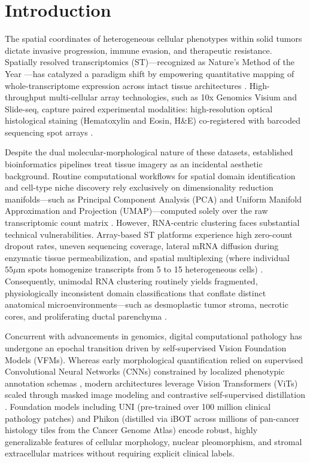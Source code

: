 \documentclass[11pt, a4paper]{article}
\begin{document}
\section{Introduction}

The spatial coordinates of heterogeneous cellular phenotypes within solid tumors dictate invasive progression, immune evasion, and therapeutic resistance. Spatially resolved transcriptomics (ST)—recognized as Nature's Method of the Year \cite{marx2021method}—has catalyzed a paradigm shift by empowering quantitative mapping of whole-transcriptome expression across intact tissue architectures \cite{stahl2016visualization, rao2021exploring, moses2022museum}. High-throughput multi-cellular array technologies, such as 10x Genomics Visium and Slide-seq, capture paired experimental modalities: high-resolution optical histological staining (Hematoxylin and Eosin, H\&E) co-registered with barcoded sequencing spot arrays \cite{stahl2016visualization, palla2022squidpy}.

Despite the dual molecular-morphological nature of these datasets, established bioinformatics pipelines treat tissue imagery as an incidental aesthetic background. Routine computational workflows for spatial domain identification and cell-type niche discovery rely exclusively on dimensionality reduction manifolds—such as Principal Component Analysis (PCA) and Uniform Manifold Approximation and Projection (UMAP)—computed solely over the raw transcriptomic count matrix \cite{wolf2018scanpy, hao2021integrated}. However, RNA-centric clustering faces substantial technical vulnerabilities. Array-based ST platforms experience high zero-count dropout rates, uneven sequencing coverage, lateral mRNA diffusion during enzymatic tissue permeabilization, and spatial multiplexing (where individual $55\mu\text{m}$ spots homogenize transcripts from 5 to 15 heterogeneous cells) \cite{larsson2021spatially}. Consequently, unimodal RNA clustering routinely yields fragmented, physiologically inconsistent domain classifications that conflate distinct anatomical microenvironments—such as desmoplastic tumor stroma, necrotic cores, and proliferating ductal parenchyma \cite{andersson2020single}.

Concurrent with advancements in genomics, digital computational pathology has undergone an epochal transition driven by self-supervised Vision Foundation Models (VFMs). Whereas early morphological quantification relied on supervised Convolutional Neural Networks (CNNs) constrained by localized phenotypic annotation schemas \cite{he2016deep, kather2019predicting}, modern architectures leverage Vision Transformers (ViTs) scaled through masked image modeling and contrastive self-supervised distillation \cite{dosovitskiy2021image, he2022masked}. Foundation models including UNI \cite{chen2024general} (pre-trained over 100 million clinical pathology patches) and Phikon \cite{filiot2024scaling} (distilled via iBOT across millions of pan-cancer histology tiles from the Cancer Genome Atlas) encode robust, highly generalizable features of cellular morphology, nuclear pleomorphism, and stromal extracellular matrices without requiring explicit clinical labels.
\end{document}
